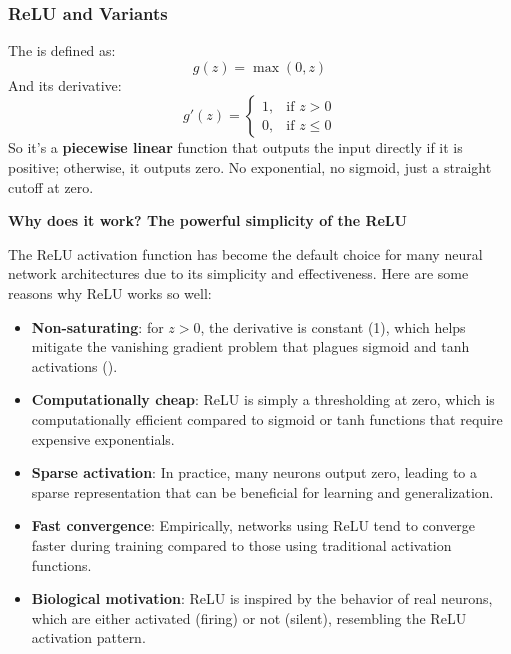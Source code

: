 \subsubsection{ReLU and Variants}\label{sec:relu-and-variants}

\begin{definitionbox}
    The  is defined as:
    \begin{equation}
        g\left(z\right) = \max\left(0, z\right)
    \end{equation}
    And its derivative:
    \begin{equation}
        g'\left(z\right) = \begin{cases}
            1, & \text{if } z > 0 \\
            0, & \text{if } z \leq 0
        \end{cases}
    \end{equation}
    So it's a \textbf{piecewise linear} function that outputs the input directly if it is positive; otherwise, it outputs zero. No exponential, no sigmoid, just a straight cutoff at zero.
\end{definitionbox}

\highspace
\begin{flushleft}
    \textcolor{Green3}{\faIcon{\speedIcon} \textbf{Why does it work? The powerful simplicity of the ReLU}}
\end{flushleft}
The ReLU activation function has become the default choice for many neural network architectures due to its simplicity and effectiveness. Here are some reasons why ReLU works so well:
\begin{itemize}
    \item[\textcolor{Green3}{\faIcon{check}}] \textbf{Non-saturating}: for $z > 0$, the derivative is constant (1), which helps mitigate the vanishing gradient problem that plagues sigmoid and tanh activations ().

    \item[\textcolor{Green3}{\faIcon{check}}] \textbf{Computationally cheap}: ReLU is simply a thresholding at zero, which is computationally efficient compared to sigmoid or tanh functions that require expensive exponentials.
    
    \item[\textcolor{Green3}{\faIcon{check}}] \textbf{Sparse activation}: In practice, many neurons output zero, leading to a sparse representation that can be beneficial for learning and generalization.
    
    \item[\textcolor{Green3}{\faIcon{check}}] \textbf{Fast convergence}: Empirically, networks using ReLU tend to converge faster during training compared to those using traditional activation functions.
    
    \item[\textcolor{Green3}{\faIcon{check}}] \textbf{Biological motivation}: ReLU is inspired by the behavior of real neurons, which are either activated (firing) or not (silent), resembling the ReLU activation pattern.
\end{itemize}

